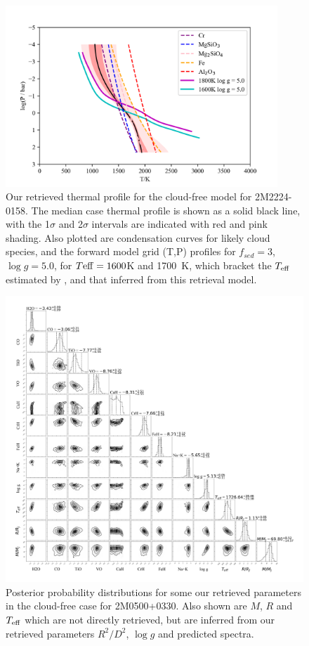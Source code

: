 \documentclass[useAMS,usenatbib]{mn2e}
\begin{document}
\begin{figure}
\hspace{-0.8cm}\includegraphics[width=290pt]{2M2224_profile_2sigma_GRID_NC_ucl.png}
\caption{Our retrieved thermal profile for the cloud-free model for 2M2224-0158. The median case thermal profile is shown as a solid black line, with the 1$\sigma$  and 2$\sigma$ intervals are indicated with red and pink shading.  Also plotted are condensation curves for likely cloud species, and the forward model grid (T,P) profiles for $f_{sed} = 3$, $\log g = 5.0$,  for $T{\rm eff} =  1600$K and 1700~K, which bracket the $T_{\rm eff}$ estimated by \citet{filippazzo2015}, and that inferred from this retrieval model.
\label{fig:2m2224NCprof}}
\end{figure}

\begin{figure}
\hspace{-0.8cm}
\includegraphics[width=550pt]{2M0500_NC_post_corner_ucl.png}
\caption{Posterior probability distributions for some our retrieved parameters in the cloud-free case for 2M0500+0330. Also shown are $M$, $R$ and $T_{\rm eff}$ which are not directly retrieved, but are inferred from our retrieved parameters $R^2/D^2$, $\log g$ and predicted spectra. 
\label{fig:2m0500post_NC}}
\end{figure}
\end{document}
